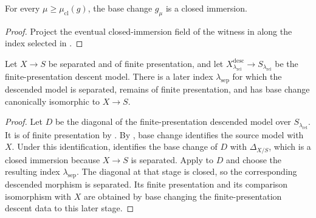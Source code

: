 \begin{lemma}
  \label{lemma:nagata-closed-immersion-descends}

  For every $\mu\geq\mu_{\mathrm{cl}}(g)$, the base change $g_\mu$ is a
  closed immersion.
\end{lemma}

\begin{proof}
  Project the eventual closed-immersion field of the witness in
   along the index selected in
  .
\end{proof}

\begin{lemma}
  \label{lemma:nagata-separated-descent-stage-exists}

  Let $X\to S$ be separated and of finite presentation, and let
  $X^{\mathrm{desc}}_{\lambda_{\mathrm{rel}}}\to
  S_{\lambda_{\mathrm{rel}}}$ be the finite-presentation descent model.
  There is a later index $\lambda_{\mathrm{sep}}$ for which the descended
  model is separated, remains of finite presentation, and has base change
  canonically isomorphic to $X\to S$.
\end{lemma}

\begin{proof}
  Let $D$ be the diagonal of the finite-presentation descended model over
  $S_{\lambda_{\mathrm{rel}}}$.  It is of finite presentation by
  .  By
  , base change identifies
  the source model with $X$.  Under this identification,
   identifies the base change of
  $D$ with $\Delta_{X/S}$, which is a closed immersion because $X\to S$ is
  separated.  Apply
   to $D$ and choose the
  resulting index $\lambda_{\mathrm{sep}}$.  The diagonal at that stage is
  closed, so the corresponding descended morphism is separated.  Its finite
  presentation and its comparison isomorphism with $X$ are obtained by base
  changing the finite-presentation descent data to this later stage.
\end{proof}

